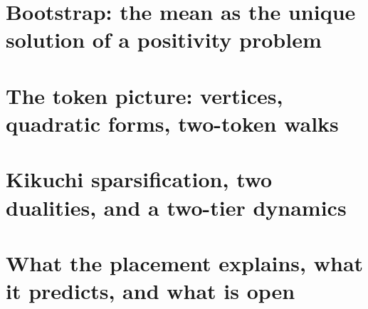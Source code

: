\documentclass[11pt]{article}
\theoremstyle{plain}
\theoremstyle{definition}\newtheorem{definition}[theorem]{Definition}\newtheorem{remark}[theorem]{Remark}
\begin{document}
\section{Bootstrap: the mean as the unique solution of a positivity problem}

\section{The token picture: vertices, quadratic forms, two-token walks}

\section{Kikuchi sparsification, two dualities, and a two-tier dynamics}

\section{What the placement explains, what it predicts, and what is open}

\end{document}
